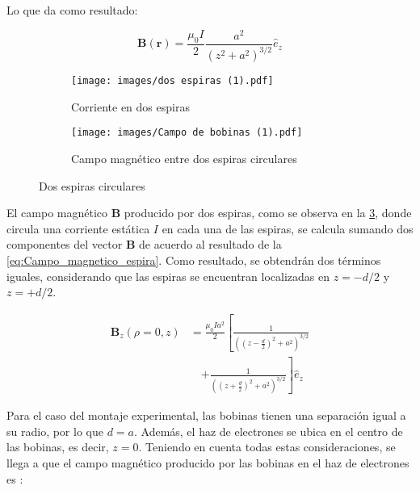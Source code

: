 Lo que da como resultado:

\begin{equation} 
    \mathbf{B}(\mathbf{r}) = \frac{\mu_{0}I}{2} \frac{a^{2}}{(z^{2}+a^{2})^{3/2}} \hat{e}_{z}
    \label{eq:Campo_magnetico_espira}
\end{equation} 

\begin{figure}[H]
    \centering
    \begin{subfigure}[a]{0.45\textwidth}
        \centering
        \texttt{[image: images/dos espiras (1).pdf]}
        \caption{Corriente en dos espiras}
        \label{fig:I_en_dos_espiras}
    \end{subfigure}
    \hfill
    \begin{subfigure}[b]{0.45\textwidth}
        \centering
        \texttt{[image: images/Campo de bobinas (1).pdf]}
        \caption{Campo magnético entre dos espiras circulares}
        \label{fig:CM_dos_espiras}
    \end{subfigure}
    \caption{Dos espiras circulares}
    \label{fig:dos_espiras}
\end{figure}

El campo magnético $\mathbf{B}$ producido por dos espiras, como se observa en la \cref{fig:dos_espiras}, donde circula una corriente estática $I$ en cada una de las espiras, se calcula sumando dos componentes del vector $\mathbf{B}$ de acuerdo al resultado de la \cref{eq:Campo_magnetico_espira}. Como resultado, se obtendrán dos términos iguales, considerando que las espiras se encuentran localizadas en $z = -d/2$ y $z = +d/2$.

\begin{equation}
\begin{aligned}
    \mathbf{B}_{z}(\rho=0,z) &= \frac{\mu_{0} I a^{2}}{2} \left[ \frac{1}{\left((z-\frac{d}{2})^{2} + a^{2}\right)^{3/2}} \right.\\
    &\quad \left.+ \frac{1}{\left((z+\frac{d}{2})^{2} + a^{2}\right)^{3/2}} \right] \hat{e}_{z}
    \label{Campo_magnetico_2espiras}
\end{aligned}
\end{equation}

Para el caso del montaje experimental, las bobinas tienen una separación igual a su radio, por lo que \( d = a \). Además, el haz de electrones se ubica en el centro de las bobinas, es decir, \( z = 0 \). Teniendo en cuenta todas estas consideraciones, se llega a que el campo magnético producido por las bobinas en el haz de electrones es \cite{boix_practica_2}:

